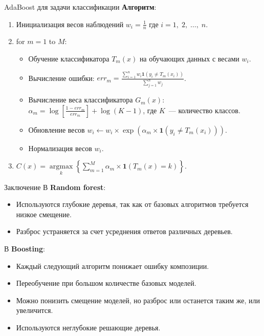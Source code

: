 \documentclass[notheorems, handout]{beamer}
\begin{document}
\begin{frame}{AdaBoost для задачи классификации}
  \textbf{Алгоритм}:
  \begin{enumerate}
    \item Инициализация весов наблюдений $w_{i} = \frac{1}{n}$
      где $i = 1,\; 2,\; \dots,\; n$.
    \item for $m = 1$ to $M$:
      \begin{itemize}
        \item Обучение классификатора $T_{m}(x)$ на обучающих данных
          с весами $w_{i}$.
        \item Вычисление ошибки: $err_{m} = \frac{\sum_{i =
            1}^{n}w_{i} \mathbf{1}\left(y_{i} \neq
          T_{m}(x_{i})\right)}{\sum_{j = 1}^{n}w_{j}}$.
        \item Вычисление веса классификатора $G_{m}(x)$: $\alpha_{m}
          = \log \left[\frac{1 - err_{m}}{err_{m}} \right] + \log(K -
          1)$, где $K$~--- количество классов.
        \item Обновление весов $w_{i} \gets w_{i} \times
          \exp(\alpha_{m}   \times \mathbf{1}(y_{i} \neq T_{m}(x_{i})))$.
        \item Нормализация весов $w_{i}$.
      \end{itemize}
    \item $C(x) =
      \underset{k}{\operatorname{argmax}}\left\{\displaystyle\sum_{m
      = 1}^{M}\alpha_{m} \times \mathbf{1}(T_{m}(x) = k)\right\}$.
  \end{enumerate}
\end{frame}

\begin{frame}{Заключение}
  В \textbf{Random forest}:
  \begin{itemize}
    \item Используются глубокие деревья, так как от базовых
      алгоритмов требуется низкое смещение.
    \item Разброс устраняется за счет усреднения ответов различных деревьев.
  \end{itemize}
  \par\smallskip
  В \textbf{Boosting}:
  \begin{itemize}
    \item Каждый следующий алгоритм понижает ошибку композиции.
    \item Переобучение при большом количестве базовых моделей.
    \item Можно понизить смещение моделей, но разброс или останется
      таким же, или увеличится.
    \item Используются неглубокие решающие деревья.
  \end{itemize}
\end{frame}
\end{document}
